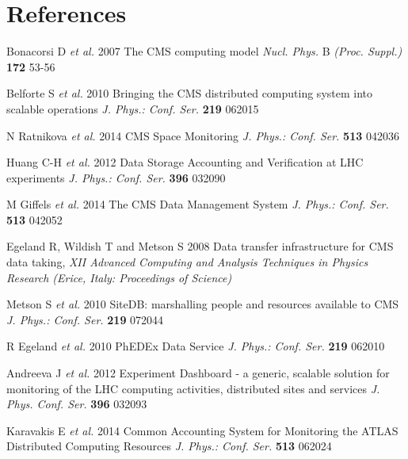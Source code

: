 \section*{References}

\begin{thebibliography}{1}

 Bonacorsi D {\it et al.} 2007 The CMS computing model 
{\it Nucl. Phys.} B {\it (Proc. Suppl.)} {\bf 172} 53-56

 Belforte S {\it et al.} 2010 Bringing the CMS distributed computing system into scalable operations 
{\it J. Phys.: Conf. Ser.} {\bf 219} 062015

N Ratnikova {\it et al.} 2014 CMS Space Monitoring {\it J. Phys.: Conf. Ser.} {\bf 513} 042036 

Huang C-H {\it et al.} 2012 Data Storage Accounting and Verification at LHC experiments 
{\it J. Phys.: Conf. Ser.} {\bf 396} 032090

M Giffels {\it et al.} 2014 The CMS Data Management System {\it J. Phys.: Conf. Ser.} {\bf 513} 042052


  Egeland R, Wildish T and Metson S 2008 Data transfer infrastructure for CMS data taking,  
{\it XII Advanced Computing and Analysis Techniques in Physics Research (Erice, Italy: Proceedings of Science)}



Metson S {\it et al.} 2010 SiteDB: marshalling people and resources available to CMS
{\it J. Phys.: Conf. Ser.} {\bf 219} 072044


 R Egeland {\it et al.} 2010  PhEDEx Data Service 
{\it J. Phys.: Conf. Ser.} {\bf 219} 062010

  Andreeva J {\it et al.} 2012 Experiment Dashboard - a generic, scalable solution for 
monitoring of the LHC computing activities, distributed sites and services 
{\it J. Phys. Conf. Ser.} {\bf 396} 032093


Karavakis E {\it et al.}  2014 Common Accounting System for Monitoring the ATLAS 
Distributed Computing Resources
{\it J. Phys.: Conf. Ser.} {\bf 513} 062024


\end{thebibliography}
